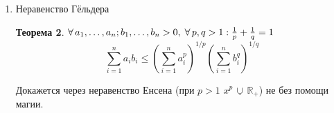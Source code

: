 \documentclass[a4paper,12pt]{article}
\newcommand\R{\mathbb{R}}
\newcommand\Q{\mathbb{Q}}
\newcommand\convex{\,\underline\cup\,}
\theoremstyle{plain}
\newtheorem{thrm}{Теорема}
\theoremstyle{definition}
\theoremstyle{remark}
\newenvironment{ittproof}{$\square$ }{ $\blacksquare$ \\}
\def\resetdefs{ \setcounter{defn}{0}\setcounter{exmp}{0} }
\def\resetthrm{ \setcounter{thrm}{0}\setcounter{stat}{0} }
\def\resetrem{ \setcounter{rem}{0} }
\def\resetall{ \resetdefs \resetthrm \resetrem}
\begin{document}
\begin{enumerate}
\begin{ittproof}
\begin{enumerate}
        \item По лемме о 3 хордах 
          \begin{align*}
            {f(x) - f(x_1) \over x - x_1} &\leq {f(x) - f(x_2)\over x - x_2} \\
            \scalebox{0.8}{($x\to x_1+0$)}\downarrow\quad &
            \qquad\downarrow \scalebox{0.8}{($x\to x_2-0$)} \\
            f'(x_1+0)                      &\leq f'(x_2-0)
          \end{align*}
        \item Так как существуют конечные $f'(x-0)$ и $f'(x+0)$, то $f(x-0)=f(x+0)=0$.
          То есть $f\in C(x)$. Однако нам ничего не известно про границы $I$. Заметим также,
          что число точек <<перелома>> не более чем счётно. Как было доказано ранее, в 
          точках, где не существует производная $f(x_0-0) < f(x_0+0)$. По теореме о полноте
          $\Q$ между ними есть $r\in \Q$. Также отметим, что $r_1 < f(x_1+0) < f(x_2-0) < r_2
          \Rightarrow r_1 < r_2$. Мы построили сюръекцию из $\Q$ в множество разрывов --- победа. 
      \end{enumerate}
    \end{ittproof}
    \begin{thrm} 
      Пусть $f : I\to \R,\; f\in C^1(I)$. Тогда $f \convex I \Leftrightarrow f' \uparrow I$.
    \end{thrm}
    \begin{ittproof}
      \begin{itemize}
        \item[\fbox{$\Rightarrow$}] следует из теоремы~\ref{thrm:derconvex}
        \item[\fbox{$\Leftarrow$}] Пусть $x_1 < x < x_2 \in I$. Из теоремы Лагранжа
        \begin{align*}
          \exists\, c_1\in (x_1,x), c_2 \in (x;x_2) : f'(c_1) = {f(x)-f(x_1)\over x-x_1},\;
          f'(c_2) = {f(x_2)-f(x)\over x_2-x} \Rightarrow \\ 
          {f(x)-f(x_1)\over x-x_1} \leq {f(x_2)-f(x)\over x_2-x}
        \end{align*} и по утверждению обратному к лемме о 3 хордах $f \convex I$ 
      \end{itemize}
    \end{ittproof}
    { \thrm Пусть $ f\in C^2(I)$. Тогда $f \convex I \Leftrightarrow f'' \geq 0 \text{ на } I$ }
  \item Неравенство Гёльдера
    \resetall
    \begin{thrm}
      $\forall\, a_1,\dots,a_n; b_1,\dots,b_n > 0 ,\; \forall\, p,q > 1: {1\over p}+{1\over q}=1$
      \[
        \sum_{i=1}^n a_ib_i \leq 
        \left( \sum_{i=1}^n a_i^p \right)^{1/p} \left( \sum_{i=1}^n b_i^q \right)^{1/q} 
      \]
    \end{thrm}
    Докажется через неравенство Енсена (при $p > 1$ $x^p \convex \R_+ $) не без помощи магии.
\end{enumerate}
\end{document}
